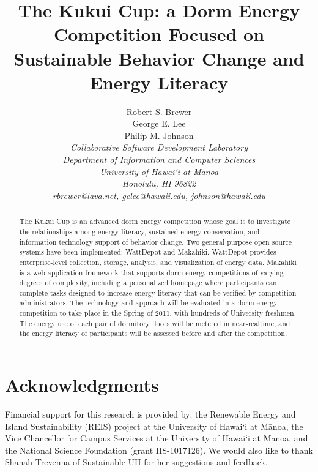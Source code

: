 \documentclass[conference]{IEEEtran}
\begin{document}
\title{The Kukui Cup: a Dorm Energy Competition Focused on Sustainable Behavior Change and Energy Literacy}

\author{Robert S. Brewer\\
        George E. Lee \\
        Philip M. Johnson\\
\em     Collaborative Software Development Laboratory\\
        Department of Information and Computer Sciences\\
        University of Hawai`i at M\=anoa\\
        Honolulu, HI 96822\\
        rbrewer@lava.net, gelee@hawaii.edu, johnson@hawaii.edu\\
}


\maketitle
\IEEEpeerreviewmaketitle
\thispagestyle{empty}

\begin{abstract}  %
The Kukui Cup is an advanced dorm energy competition whose goal is to
investigate the relationships among energy literacy, sustained energy
conservation, and information technology support of behavior change. Two
general purpose open source systems have been implemented: WattDepot and
Makahiki. WattDepot provides enterprise-level collection, storage, analysis,
and visualization of energy data. Makahiki is a web application framework that
supports dorm energy competitions of varying degrees of complexity,
including a personalized homepage where participants can complete tasks
designed to increase energy literacy that can be verified by competition
administrators. The technology and approach will be evaluated in a dorm energy
competition to take place in the Spring of 2011, with hundreds of University
freshmen. The energy use of each pair of dormitory floors will be metered in
near-realtime, and the energy literacy of participants will be assessed before
and after the competition.
\end{abstract}







\section{Acknowledgments}

Financial support for this research is provided by: the Renewable Energy and
Island Sustainability (REIS) project at the University of Hawai`i at M\=anoa,
the Vice Chancellor for Campus Services at the University of Hawai`i at M\=anoa,
and the National Science Foundation (grant IIS-1017126). We would also like to
thank Shanah Trevenna of Sustainable UH for her suggestions and feedback.



\end{document}
